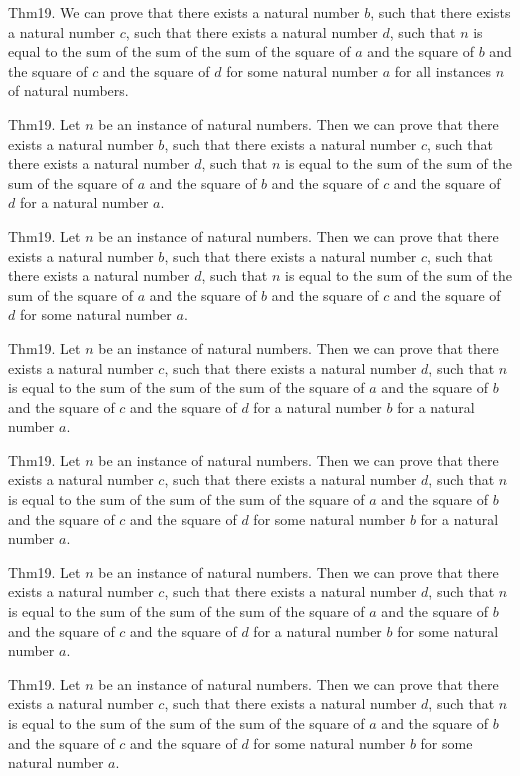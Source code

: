 \documentclass{article}
\begin{document}
Thm19. We can prove that there exists a natural number $b$, such that there exists a natural number $c$, such that there exists a natural number $d$, such that $n$ is equal to the sum of the sum of the sum of the square of $a$ and the square of $b$ and the square of $c$ and the square of $d$ for some natural number $a$ for all instances $n$ of natural numbers.

Thm19. Let $n$ be an instance of natural numbers. Then we can prove that there exists a natural number $b$, such that there exists a natural number $c$, such that there exists a natural number $d$, such that $n$ is equal to the sum of the sum of the sum of the square of $a$ and the square of $b$ and the square of $c$ and the square of $d$ for a natural number $a$.

Thm19. Let $n$ be an instance of natural numbers. Then we can prove that there exists a natural number $b$, such that there exists a natural number $c$, such that there exists a natural number $d$, such that $n$ is equal to the sum of the sum of the sum of the square of $a$ and the square of $b$ and the square of $c$ and the square of $d$ for some natural number $a$.

Thm19. Let $n$ be an instance of natural numbers. Then we can prove that there exists a natural number $c$, such that there exists a natural number $d$, such that $n$ is equal to the sum of the sum of the sum of the square of $a$ and the square of $b$ and the square of $c$ and the square of $d$ for a natural number $b$ for a natural number $a$.

Thm19. Let $n$ be an instance of natural numbers. Then we can prove that there exists a natural number $c$, such that there exists a natural number $d$, such that $n$ is equal to the sum of the sum of the sum of the square of $a$ and the square of $b$ and the square of $c$ and the square of $d$ for some natural number $b$ for a natural number $a$.

Thm19. Let $n$ be an instance of natural numbers. Then we can prove that there exists a natural number $c$, such that there exists a natural number $d$, such that $n$ is equal to the sum of the sum of the sum of the square of $a$ and the square of $b$ and the square of $c$ and the square of $d$ for a natural number $b$ for some natural number $a$.

Thm19. Let $n$ be an instance of natural numbers. Then we can prove that there exists a natural number $c$, such that there exists a natural number $d$, such that $n$ is equal to the sum of the sum of the sum of the square of $a$ and the square of $b$ and the square of $c$ and the square of $d$ for some natural number $b$ for some natural number $a$.
\end{document}
